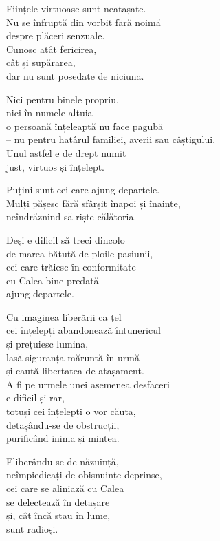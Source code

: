 Ființele virtuoase sunt neatașate.\\
Nu se înfruptă din vorbit fără noimă\\
despre plăceri senzuale.\\
Cunosc atât fericirea,\\
cât și supărarea,\\
dar nu sunt posedate de niciuna.


Nici pentru binele propriu,\\
nici în numele altuia\\
o persoană înțeleaptă nu face pagubă\\
– nu pentru hatârul familiei, averii sau câștigului.\\
Unul astfel e de drept numit\\
just, virtuos și înțelept.


Puțini sunt cei care ajung departele.\\
Mulți pășesc fără sfârșit înapoi și înainte,\\
neîndrăznind să riște călătoria.


Deși e dificil să treci dincolo\\
de marea bătută de ploile pasiunii,\\
cei care trăiesc în conformitate\\
cu Calea bine-predată\\
ajung departele.


Cu imaginea liberării ca țel\\
cei înțelepți abandonează întunericul\\
și prețuiesc lumina,\\
lasă siguranța măruntă în urmă\\
și caută libertatea de atașament.\\
A fi pe urmele unei asemenea desfaceri\\
e dificil și rar,\\
totuși cei înțelepți o vor căuta,\\
detașându-se de obstrucții,\\
purificând inima și mintea.


Eliberându-se de năzuință,\\
neîmpiedicați de obișnuințe deprinse,\\
cei care se aliniază cu Calea\\
se delectează în detașare\\
și, cât încă stau în lume,\\
sunt radioși.
